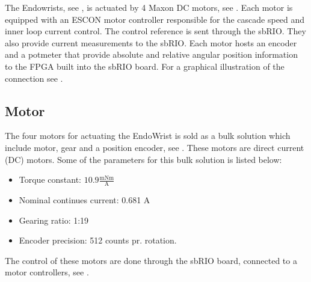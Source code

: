 The Endowrists, see , is actuated by 4 Maxon DC motors, see . Each motor is equipped with an ESCON motor controller responsible for the cascade speed and inner loop current control. The control reference is sent through the sbRIO. They also provide current measurements to the sbRIO. Each motor hosts an encoder and a potmeter that provide absolute and relative angular position information to the FPGA built into the sbRIO board. For a graphical illustration of the connection see .


\subsection{Motor}\label{Maxon_Motor}
The four motors for actuating the EndoWrist is sold as a bulk solution which include motor\cite{motor_motor}, gear\cite{motor_gear} and a position encoder\cite{motor_encoder}, see .
These motors are direct current (DC) motors. Some of the parameters for this bulk solution is listed below:

\begin{itemize}
\item Torque constant: $10.9\frac{\text{mNm}}{\text{A}}$
\item Nominal continues current: 0.681 A 
\item Gearing ratio: 1:19
\item Encoder precision: 512 counts pr. rotation.
\end{itemize}

The control of these motors are done through the sbRIO board, connected to a motor controllers, see .

